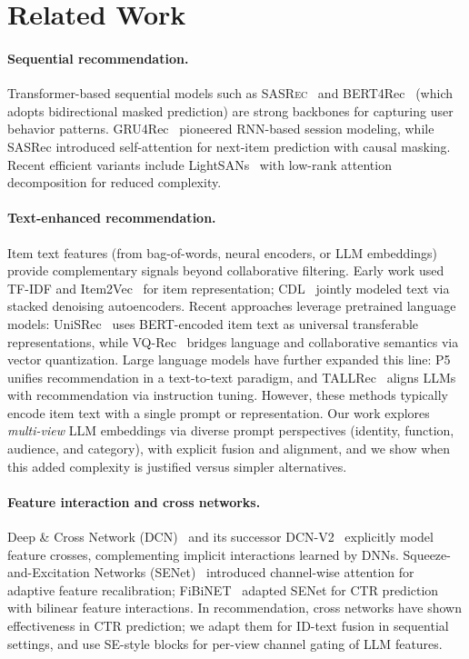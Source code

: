 \documentclass[sigconf,natbib=true,anonymous]{acmart}
\newcommand{\base}{\textsc{SASRec}\xspace}
\newcommand{\llm}{\textsc{LLM}\xspace}
\begin{document}
\section{Related Work}
\paragraph{Sequential recommendation.}
Transformer-based sequential models such as
\base~\cite{kang2018sasrec} and BERT4Rec~\cite{sun2019bert4rec}
(which adopts bidirectional masked prediction) are strong backbones for
capturing user behavior patterns.
GRU4Rec~\cite{hidasi2016gru4rec} pioneered RNN-based session
modeling, while SASRec introduced self-attention for next-item
prediction with causal masking. Recent efficient variants
include LightSANs~\cite{fan2021lightsans} with low-rank
attention decomposition for reduced complexity.

\paragraph{Text-enhanced recommendation.}
\begin{sloppypar}
Item text features (from bag-of-words, neural encoders, or
\llm embeddings) provide complementary signals beyond
collaborative filtering. Early work used TF-IDF and
Item2Vec~\cite{barkan2016item2vec} for item representation;
CDL~\cite{wang2015cdl} jointly modeled text via stacked
denoising autoencoders. Recent approaches leverage pretrained
language models: UniSRec~\cite{hou2022unisrec} uses
BERT-encoded item text as universal transferable
representations, while VQ-Rec~\cite{hou2023vqrec} bridges
language and collaborative semantics via vector quantization.
Large language models have further expanded this line:
P5~\cite{geng2022p5} unifies recommendation in a text-to-text
paradigm, and TALLRec~\cite{bao2023tallrec} aligns LLMs with
recommendation via instruction tuning.
However, these methods typically encode item text with a single
prompt or representation.
Our work explores \emph{multi-view} \llm embeddings via diverse
prompt perspectives (identity, function, audience, and category),
with explicit fusion and alignment, and we show when this added
complexity is justified versus simpler alternatives.
\end{sloppypar}

\paragraph{Feature interaction and cross networks.}
Deep \& Cross Network (DCN)~\cite{wang2017dcn} and its
successor DCN-V2~\cite{wang2021dcnv2} explicitly model feature
crosses, complementing implicit interactions learned by DNNs.
Squeeze-and-Excitation Networks (SENet)~\cite{hu2018senet}
introduced channel-wise attention for adaptive feature
recalibration; FiBiNET~\cite{huang2019fibinet} adapted SENet
for CTR prediction with bilinear feature interactions. In
recommendation, cross networks have shown effectiveness in CTR
prediction; we adapt them for ID-text fusion in sequential
settings, and use SE-style blocks for per-view channel gating of \llm
features.
\end{document}
